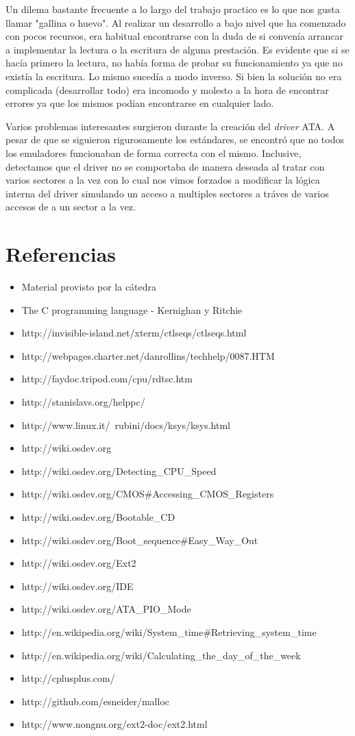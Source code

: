 \documentclass[a4paper,10pt]{article}
\begin{document}
Un dilema bastante frecuente a lo largo del trabajo practico es lo que nos gusta llamar "gallina o huevo". Al realizar
un desarrollo a bajo nivel que ha comenzado con pocos recursos, era habitual encontrarse con la duda de si convenía
arrancar a implementar la lectura o la escritura de alguna prestación. Es evidente que si se hacía primero la lectura, 
no había forma de probar su funcionamiento ya que no existía la escritura. Lo mismo sucedía a modo inverso. Si bien 
la solución no era complicada (desarrollar todo) era incomodo y molesto a la hora de encontrar errores ya que los mismos
podían encontrarse en cualquier lado.

Varios problemas interesantes surgieron durante la creación del \textit{driver} ATA. A pesar de que se siguieron
rigurosamente los estándares, se encontró que no todos los emuladores funcionaban de forma correcta con el mismo.
Inclusive, detectamos que el driver no se comportaba de manera deseada al tratar con varios sectores a la vez con lo
cual nos vimos forzados a modificar la lógica interna del driver simulando un acceso a multiples sectores a tráves de
varios accesos de a un sector a la vez.

\newpage     
\section{Referencias}

\begin{itemize}
  \item Material provisto por la cátedra
  \item The C programming language - Kernighan y Ritchie
  \item http://invisible-island.net/xterm/ctlseqs/ctlseqs.html
  \item http://webpages.charter.net/danrollins/techhelp/0087.HTM
  \item http://faydoc.tripod.com/cpu/rdtsc.htm
  \item http://stanislavs.org/helppc/
  \item http://www.linux.it/~rubini/docs/ksys/ksys.html
  \item http://wiki.osdev.org
  \item http://wiki.osdev.org/Detecting\_CPU\_Speed
  \item	http://wiki.osdev.org/CMOS\#Accessing\_CMOS\_Registers
  \item http://wiki.osdev.org/Bootable\_CD
  \item http://wiki.osdev.org/Boot\_sequence\#Easy\_Way\_Out
  \item http://wiki.osdev.org/Ext2
  \item http://wiki.osdev.org/IDE
  \item http://wiki.osdev.org/ATA\_PIO\_Mode
  \item http://en.wikipedia.org/wiki/System\_time\#Retrieving\_system\_time
  \item http://en.wikipedia.org/wiki/Calculating\_the\_day\_of\_the\_week
  \item http://cplusplus.com/
  \item http://github.com/esneider/malloc
  \item http://www.nongnu.org/ext2-doc/ext2.html
\end{itemize}
   
\end{document}
